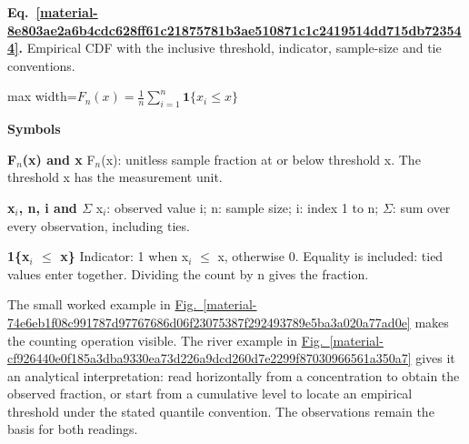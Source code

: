 \documentclass[11pt,a4paper]{article}
\begin{document}
\par\medskip
\begin{samepage}
\label{material-8e803ae2a6b4cdc628ff61c21875781b3ae510871c1c2419514dd715db723544}
\noindent\textbf{Eq.~\ref*{material-8e803ae2a6b4cdc628ff61c21875781b3ae510871c1c2419514dd715db723544}.} Empirical CDF with the inclusive threshold, indicator, sample-size and tie conventions.\par\nopagebreak
\begin{center}\begin{adjustbox}{max width=\linewidth}$\displaystyle F_n(x)=\frac1n\sum_{i=1}^{n}\mathbf{1}\{x_i\le x\}$\end{adjustbox}\end{center}

\par\noindent\textbf{Symbols}

\par\noindent\textbf{F\ensuremath{{}_n}(x) and x} F\ensuremath{{}_n}(x): unitless sample fraction at or below threshold x. The threshold x has the measurement unit.

\par\noindent\textbf{x\ensuremath{{}_i}, n, i and \ensuremath{\Sigma}} x\ensuremath{{}_i}: observed value i; n: sample size; i: index 1 to n; \ensuremath{\Sigma}: sum over every observation, including ties.

\par\noindent\textbf{1\{x\ensuremath{{}_i} \ensuremath{\le} x\}} Indicator: 1 when x\ensuremath{{}_i} \ensuremath{\le} x, otherwise 0. Equality is included: tied values enter together. Dividing the count by n gives the fraction.

\end{samepage}
\medskip

The small worked example in \hyperref[material-74e6eb1f08c991787d97767686d06f23075387f292493789e5ba3a020a77ad0e]{Fig.~\ref*{material-74e6eb1f08c991787d97767686d06f23075387f292493789e5ba3a020a77ad0e}} makes the counting operation visible. The river example in \hyperref[material-cf926440e0f185a3dba9330ea73d226a9dcd260d7e2299f87030966561a350a7]{Fig.~\ref*{material-cf926440e0f185a3dba9330ea73d226a9dcd260d7e2299f87030966561a350a7}} gives it an analytical interpretation: read horizontally from a concentration to obtain the observed fraction, or start from a cumulative level to locate an empirical threshold under the stated quantile convention. The observations remain the basis for both readings.
\end{document}

